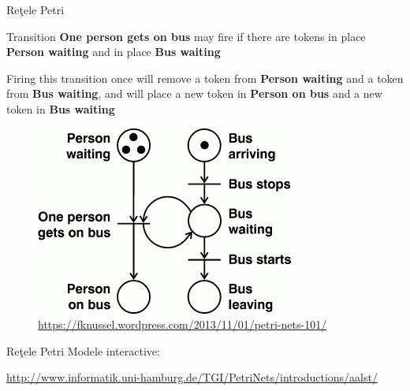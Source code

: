 \documentclass{beamer}
\begin{document}
\begin{frame}{Reţele Petri}

Transition \textbf{One person gets on bus} may fire if there are tokens in place \textbf{Person waiting} and in place \textbf{Bus waiting}

\vspace{0.5cm}

Firing this transition once will remove a token from \textbf{Person waiting} and a token from \textbf{Bus waiting}, and will place a new token in \textbf{Person on bus} and a new token in \textbf{Bus waiting}

\vspace{0.5cm}

\begin{figure}
\includegraphics[scale=0.4]{images/pn_bus}
\caption{\label{fig:pn_bus}\url{https://fknussel.wordpress.com/2013/11/01/petri-nets-101/}}
\end{figure}
\end{frame}



\begin{frame}{Reţele Petri}
Modele interactive:

\vspace{0.5cm}

\url{http://www.informatik.uni-hamburg.de/TGI/PetriNets/introductions/aalst/}
\end{frame}
\end{document}
